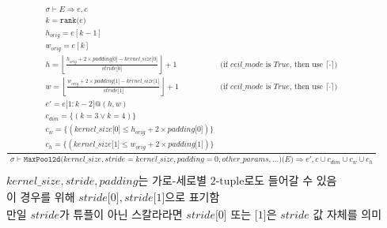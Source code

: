 \documentclass{article}
\makeatletter
\newcommand{\x}{\times}
\newcommand{\Rar}{\Rightarrow}
\newcommand{\mtt}[1]{\mathtt{#1}}
\newcommand{\op}[2]{\mtt{#1(}#2\mtt{)}}
\newcommand{\module}[3]{\mtt{#1(}#2\mtt{)(}#3\mtt{)}}
\newcommand{\conc}{\mtt{@}}
\newcommand{\ind}[1]{\mtt{[}#1\mtt{]}}
\newcommand{\indr}[2]{\mtt{[}#1\mtt{:}#2\mtt{]}}
\makeatother
\begin{document}
\begin{align*}
  \frac
  {
    \begin{array}{ll}
      \sigma \vdash E \Rar e, c \\
      k = \op{rank}{e} \\
      h_{orig} = e[k-1] \\
      w_{orig} = e[k] \\
      h = \left\lfloor \frac{h_{orig} + 2 \x padding \ind{0} - 
        kernel\_size \ind{0}}{stride \ind{0}} \right\rfloor + 1 &
        \text{(if $ceil\_mode$ is $True$, then use $\lceil \cdot \rceil$)}\\
      w = \left\lfloor \frac{w_{orig} + 2 \x padding \ind{1} -
        kernel\_size \ind{1}}{stride \ind{1}} \right\rfloor + 1 &
        \text{(if $ceil\_mode$ is $True$, then use $\lceil \cdot \rceil$)}\\
      e' = e\indr{1}{k-2} \conc (h, w) \\
      c_{dim} = \{ (k = 3 \lor k = 4) \} \\
      c_w = \{ (kernel\_size\ind{0} \leq h_{orig} + 2 \x padding \ind{0}) \} \\
      c_h = \{ (kernel\_size\ind{1} \leq w_{orig} + 2 \x padding \ind{1}) \} 
    \end{array}
  }
  {
    \begin{array}{c}
      \sigma \vdash \module{MaxPool2d}{kernel\_size, stride=kernel\_size,
        padding=0, other\_params, ...}{E}
        \Rar e', c \cup c_{dim} \cup c_w \cup c_h 
    \end{array}
  } \\
  \\
  \text{$kernel\_size, stride, padding$는 가로-세로별 2-tuple로도 들어갈
  수 있음} \\
  \text{이 경우를 위해 $stride\ind{0}, stride\ind{1}$으로 표기함} \\
  \text{만일 $stride$가 튜플이 아닌 스칼라라면 $stride\ind{0}$ 또는 $\ind{1}$은
    $stride$ 값 자체를 의미}
\end{align*}%
\end{document}
